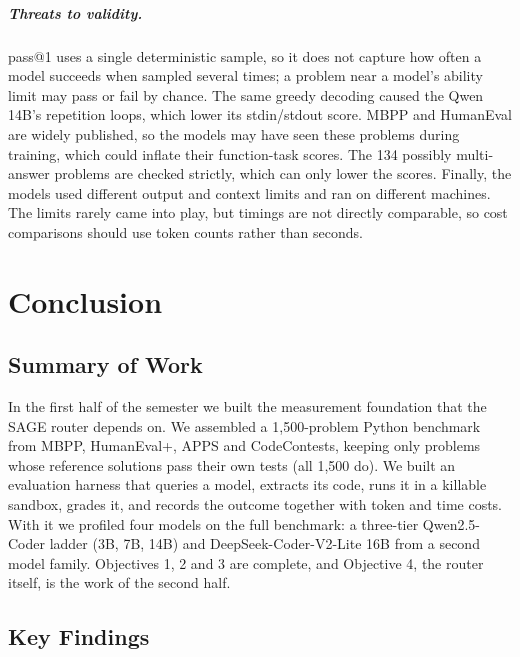 \paragraph{Threats to validity.} pass@1 uses a single deterministic sample, so it does not capture how often a model succeeds when sampled several times; a problem near a model's ability limit may pass or fail by chance. The same greedy decoding caused the Qwen 14B's repetition loops, which lower its stdin/stdout score. MBPP and HumanEval are widely published, so the models may have seen these problems during training, which could inflate their function-task scores. The 134 possibly multi-answer problems are checked strictly, which can only lower the scores. Finally, the models used different output and context limits and ran on different machines. The limits rarely came into play, but timings are not directly comparable, so cost comparisons should use token counts rather than seconds.

\chapter{Conclusion}

\section{Summary of Work}

In the first half of the semester we built the measurement foundation that the SAGE router depends on. We assembled a 1,500-problem Python benchmark from MBPP, HumanEval+, APPS and CodeContests, keeping only problems whose reference solutions pass their own tests (all 1,500 do). We built an evaluation harness that queries a model, extracts its code, runs it in a killable sandbox, grades it, and records the outcome together with token and time costs. With it we profiled four models on the full benchmark: a three-tier Qwen2.5-Coder ladder (3B, 7B, 14B) and DeepSeek-Coder-V2-Lite 16B from a second model family. Objectives 1, 2 and 3 are complete, and Objective 4, the router itself, is the work of the second half.

\section{Key Findings}

